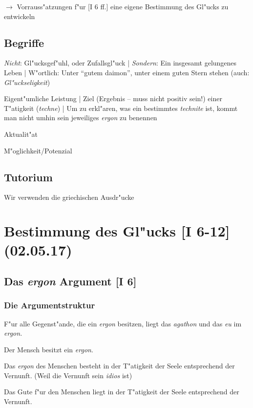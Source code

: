 \documentclass[emulatestandardclasses]{scrartcl}
\begin{document}
\noindent $\rightarrow$ Vorrauss"atzungen f"ur [I 6 ff.] eine eigene Bestimmung des Gl"ucks zu entwickeln

\subsection{Begriffe}

\begin{description}[leftmargin=!,labelwidth=\widthof{\bfseries \emph{eudaemonia}}]
  \item[\emph{eudaimonia}] \emph{Nicht}: Gl"ucksgef"uhl, oder Zufallsgl"uck | \emph{Sondern}: Ein insgesamt gelungenes Leben | W"ortlich: Unter "`gutem daimon"', unter einem guten Stern stehen (auch: \emph{Gl"uckseligkeit})
  \item[\emph{ergon}] Eigent"umliche Leistung | Ziel (Ergebnis -- muss nicht positiv sein!) einer T"atigkeit (\emph{techne}) | Um zu erkl"aren, was ein bestimmtes \emph{technite} ist, kommt man nicht umhin sein jeweiliges \emph{ergon} zu benennen
  \item[\emph{energeia}] Aktualit"at
  \item[\emph{dynamis}] M"oglichkeit/Potenzial
\end{description}

\subsection{Tutorium}

Wir verwenden die griechischen Ausdr"ucke


\section{Bestimmung des Gl"ucks [I 6-12]\\(02.05.17)}

\subsection{Das \emph{ergon} Argument [I 6]}

\subsubsection{Die Argumentstruktur}

\begin{description}[leftmargin=!,labelwidth=\widthof{\bfseries P3}]
  \item[P1] F"ur alle Gegenst"ande, die ein \emph{ergon} besitzen, liegt das \emph{agathon} und das \emph{eu} im \emph{ergon.}
  \item[P2] Der Mensch besitzt ein \emph{ergon}.
  \item[P3] Das \emph{ergon} des Menschen besteht in der T"atigkeit der Seele entsprechend der Vernunft. (Weil die Vernunft sein \emph{idios} ist)
  \item[K] Das Gute f"ur den Menschen liegt in der T"atigkeit der Seele entsprechend der Vernunft.
\end{description}
\end{document}
